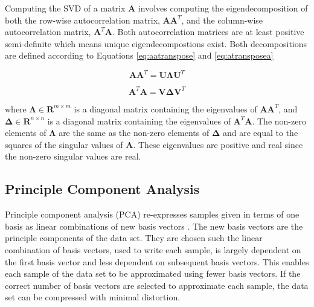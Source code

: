 \documentclass[conference]{IEEEtran}
\begin{document}
    Computing the SVD of a matrix $\mathbf{A}$ involves computing the eigendecomposition of both the row-wise autocorrelation matrix, $\mathbf{AA}^T$, and the column-wise autocorrelation matrix, $\mathbf{A}^T\mathbf{A}$. Both autocorrelation matrices are at least positive semi-definite which means unique eigendecompostions exist. Both decompositions are defined according to Equations \ref{eq:aatranspose} and \ref{eq:atransposea}

    \begin{equation}
         \mathbf{AA}^{T} = \mathbf{U\Lambda}\mathbf{U}^T
    \label{eq:aatranspose}
    \end{equation}

    \begin{equation}
         \mathbf{A}^T\mathbf{A} = \mathbf{V\Delta}\mathbf{V}^T
    \label{eq:atransposea}
    \end{equation}
    
    where $\mathbf{\Lambda} \in \mathbf{R}^{m \times m}$ is a diagonal matrix containing the eigenvalues of $\mathbf{AA}^{T}$, and $\mathbf{\Delta} \in \mathbf{R}^{n \times n}$ is a diagonal matrix containing the eigenvalues of $\mathbf{A}^T\mathbf{A}$. The non-zero elements of $\mathbf{\Lambda}$ are the same as the non-zero elements of $\mathbf{\Delta}$ and are equal to the squares of the singular values of $\mathbf{A}$. These eigenvalues are positive and real since the non-zero singular values are real.
    
    \subsection{Principle Component Analysis} \label{pca_section}
    
    Principle component analysis (PCA) re-expresses samples given in terms of one basis as linear combinations of new basis vectors \cite{shlens_2014_tutorial}. The new basis vectors are the principle components of the data set. They are chosen such the linear combination of basis vectors, used to write each sample, is largely dependent on the first basis vector and less dependent on subsequent basis vectors. This enables each sample of the data set to be approximated using fewer basis vectors. If the correct number of basis vectors are selected to approximate each sample, the data set can be compressed with minimal distortion.
    
\end{document}
